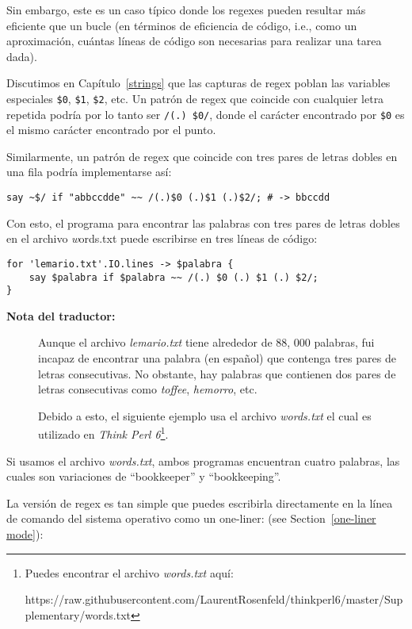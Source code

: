 Sin embargo, este es un caso típico donde los regexes 
pueden resultar más eficiente que un bucle (en términos de 
eficiencia de código, i.e., como un aproximación, cuántas líneas
de código son necesarias para realizar una tarea dada).

Discutimos en Capítulo~\ref{strings} que las capturas de 
regex poblan las variables especiales \verb|$0|, \verb|$1|, \verb|$2|, etc.
Un patrón de regex que coincide con cualquier letra repetida
podría por lo tanto ser \verb|/(.) $0/|, donde el carácter encontrado
por \verb|$0| es el mismo carácter encontrado por el punto.

Similarmente, un patrón de regex que coincide con tres pares de letras
dobles en una fila podría implementarse así:
\begin{verbatim}
say ~$/ if "abbccdde" ~~ /(.)$0 (.)$1 (.)$2/; # -> bbccdd 
\end{verbatim}

Con esto, el programa para encontrar las palabras con tres pares
de letras dobles en el archivo {\emph words.txt} puede escribirse
en tres líneas de código:

\begin{verbatim}
for 'lemario.txt'.IO.lines -> $palabra {
    say $palabra if $palabra ~~ /(.) $0 (.) $1 (.) $2/;
}
\end{verbatim}
%

\begin{description}


\item[{\bf Nota del traductor:}] Aunque el archivo {\em lemario.txt}
tiene alrededor de 88, 000 palabras, fui incapaz de encontrar
una palabra (en español) que contenga tres pares de letras consecutivas.
No obstante, hay palabras que contienen dos pares de letras consecutivas
como \emph{toffee}, \emph{hemorro}, etc. 

Debido a esto, 
el siguiente ejemplo usa el archivo {\em words.txt} el cual es 
utilizado en {\em Think Perl 6}\footnote{
Puedes encontrar el archivo \emph{words.txt} aquí: 

https://raw.githubusercontent.com/LaurentRosenfeld/thinkperl6/master/Supplementary/words.txt
}.
\end{description}

Si usamos el archivo {\em words.txt}, ambos programas encuentran
cuatro palabras, las cuales son variaciones de ``bookkeeper'' y
``bookkeeping''.

La versión de regex es tan simple que puedes escribirla directamente
en la línea de comando del sistema operativo como un one-liner:
(see Section~\ref{one-liner mode}):

